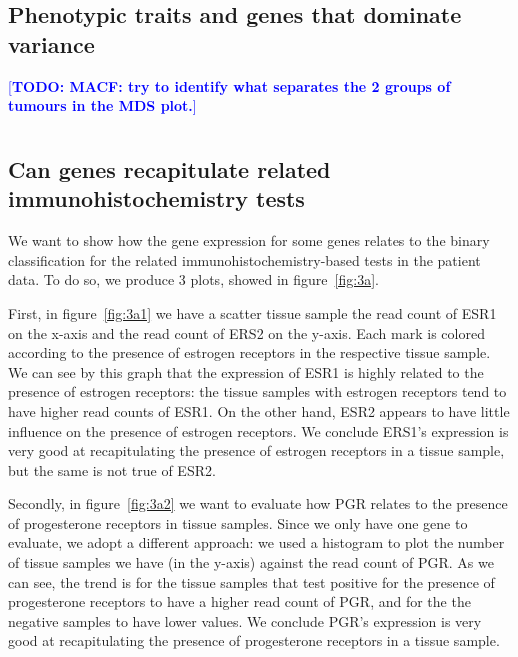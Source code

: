 \documentclass[10pt,twocolumn]{article}\usepackage[]{graphicx}\usepackage[]{color}
\newcommand{\todo}[1]{\textcolor{blue}{[\textbf{TODO: #1}]} }
\begin{document}
\subsection{Phenotypic traits and genes that dominate variance} %
  
\todo{MACF: try to identify what separates the 2 groups of tumours in the MDS plot.}
\subsection{} %

\section{} %

\subsection{Can genes recapitulate related immunohistochemistry tests} %

We want to show how the gene expression for some genes relates to the binary classification for the related immunohistochemistry-based tests in the patient data. To do so, we produce 3 plots, showed in figure~\ref{fig:3a}.

First, in figure~\ref{fig:3a1} we have a scatter tissue sample the read count of ESR1 on the x-axis and the read count of ERS2 on the y-axis. Each mark is colored according to the presence of estrogen receptors in the respective tissue sample. We can see by this graph that the expression of ESR1 is highly related to the presence of estrogen receptors: the tissue samples with estrogen receptors tend to have higher read counts of ESR1. On the other hand, ESR2 appears to have little influence on the presence of estrogen receptors. We conclude ERS1's expression is very good at recapitulating the presence of estrogen receptors in a tissue sample, but the same is not true of ESR2.

Secondly, in figure~\ref{fig:3a2} we want to evaluate how PGR relates to the presence of progesterone receptors in tissue samples. Since we only have one gene to evaluate, we adopt a different approach: we used a histogram to plot the number of tissue samples we have (in the y-axis) against the read count of PGR. As we can see, the trend is for the tissue samples that test positive for the presence of progesterone receptors to have a higher read count of PGR, and for the the negative samples to have lower values.  We conclude PGR's expression is very good at recapitulating the presence of progesterone receptors in a tissue sample.
\end{document}
